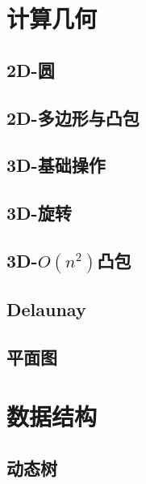 \documentclass[a4papar,landscape]{article}
\begin{document}
\begin{multicols}{2}
\setcounter{tocdepth}{5}
\tableofcontents
\newpage

\section{计算几何}

	\subsection{2D-圆}
		
	\subsection{2D-多边形与凸包}
		
	\subsection{3D-基础操作}
		
	\subsection{3D-旋转}
		
	\subsection{3D-$O(n^2)$凸包}
		
	\lstset{language=Java}
	\subsection{Delaunay}
		
	\lstset{language=C++}
	\subsection{平面图}
		

\section{数据结构}

	\subsection{动态树}
		


\end{multicols}
\end{document}
